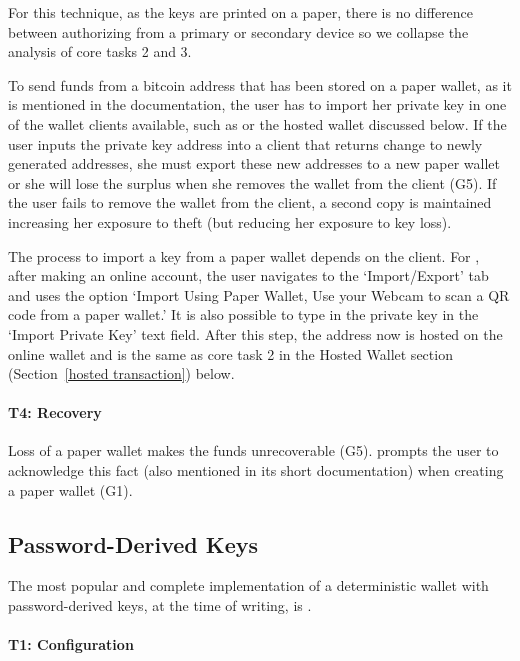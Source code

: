 For this technique, as the keys are printed on a paper, there is no difference between authorizing from a primary or secondary device so we collapse the analysis of core tasks 2 and 3.
 
To send funds from a bitcoin address that has been stored on a paper wallet, as it is mentioned in the documentation, the user has to import her private key in one of the wallet clients available, such as \armory or the \block hosted wallet discussed below. If the user inputs the private key address into a client that returns change to newly generated addresses, she must export these new addresses to a new paper wallet or she will lose the surplus when she removes the wallet from the client (G5). If the user fails to remove the wallet from the client, a second copy is maintained increasing her exposure to theft (but reducing her exposure to key loss). 

The process to import a key from a paper wallet depends on the client. For \block, after making an online account, the user navigates to the `Import/Export' tab and uses the option `Import Using Paper Wallet, Use your Webcam to scan a QR code from a paper wallet.' It is also possible to type in the private key in the `Import Private Key' text field. After this step, the address now is hosted on the online wallet and is the same as core task 2 in the Hosted Wallet section (Section~\ref{hosted transaction}) below.

\paragraph{T4: Recovery}

Loss of a paper wallet makes the funds unrecoverable (G5). \paper prompts the user to acknowledge this fact (also mentioned in its short documentation) when creating a paper wallet (G1).


\subsection{Password-Derived Keys} The most popular and complete implementation of a deterministic wallet with password-derived keys, at the time of writing, is \brain.

\paragraph{T1: Configuration} 


